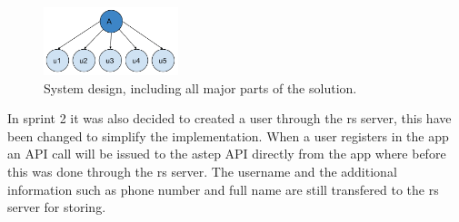 \begin{figure}[!h]
	\centering
	\includegraphics[width=0.35\textwidth]{figures/userafter.pdf}
	\caption{System design, including all major parts of the solution.}
	\label{fig:userafter}
\end{figure}

In sprint 2 it was also decided to created a user through the \gls{rs} server, this have been changed to simplify the implementation.
When a user registers in the app an API call will be issued to the \gls{astep} API directly from the app where before this was done through the \gls{rs} server. 
The username and the additional information such as phone number and full name are still transfered to the \gls{rs} server for storing.
